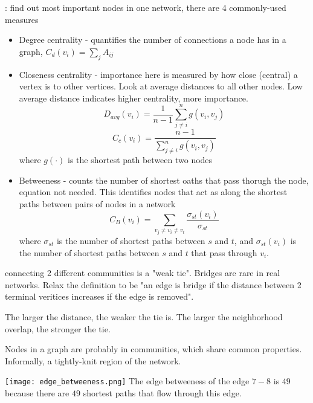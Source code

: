 \documentclass[12pt]{scrartcl}
\begin{document}
\begin{definition}
  : find out most important nodes in one network, 
  there are 4 commonly-used measures
  \begin{itemize}
    \item Degree centrality - quantifies the number of connections a node has in a graph, $C_d(v_i) = \sum_j A_{ij}$
    \item Closeness centrality - importance here is measured by how close (central) a vertex is to other vertices. Look at 
    average distances to all other nodes. Low average distance indicates higher centrality, more importance.
    \[D_{avg}(v_i) = \frac{1}{n-1}\sum_{j\neq i}^n g(v_i, v_j)\]
    \[C_c(v_i) = \frac{n-1}{\sum_{j\neq i}^n g(v_i, v_j)}\]
    where $g(\cdot)$ is the shortest path between two nodes
    \item Betweeness - counts the number of shortest oaths that pass thorugh the node, equation not needed. This identifies nodes 
    that act as  along the shortest paths between pairs of nodes in a network
    \[C_B(v_i) = \sum_{v_j \neq v_i \neq v_t} \frac{\sigma_{st}(v_i)}{\sigma_{st}}\]
    where $\sigma_{st}$ is the number of shortest paths between $s$ and $t$, and $\sigma_{st}(v_i)$ 
    is the number of shortest paths between $s$ and $t$ that pass through $v_i$.
  \end{itemize}
\end{definition}

\begin{definition}
   connecting 2 different communities is a "weak tie". Bridges are rare 
  in real networks. Relax the definition to be "an edge is bridge if the distance between 2
  terminal veritices increases if the edge is removed". 
\end{definition}

\begin{note}
  The larger the distance, the weaker the tie is. The larger the 
  neighborhood overlap, the stronger the tie.
\end{note}

\begin{definition}
  Nodes in a graph are probably in communities, which share common properties. Informally, a 
  tightly-knit region of the network. 
\end{definition}


\begin{example}
  \texttt{[image: edge\_betweeness.png]}
  The edge betweeness of the edge $7-8$ is $49$ because there are 
  $49$ shortest paths that flow through this edge.
\end{example}
\end{document}

